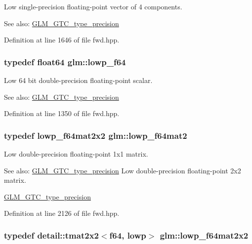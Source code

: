 Low single-precision floating-point vector of 4 components. \begin{Desc}
\item[See also:]\hyperlink{group__gtc__type__precision}{GLM\_\-GTC\_\-type\_\-precision} \end{Desc}


Definition at line 1646 of file fwd.hpp.\hypertarget{group__gtc__type__precision_g59839f4bf6b97c93b0def577890bbfb8}{
\subsubsection[lowp\_\-f64]{\setlength{\rightskip}{0pt plus 5cm}typedef float64 {\bf glm::lowp\_\-f64}}}
\label{group__gtc__type__precision_g59839f4bf6b97c93b0def577890bbfb8}


Low 64 bit double-precision floating-point scalar. \begin{Desc}
\item[See also:]\hyperlink{group__gtc__type__precision}{GLM\_\-GTC\_\-type\_\-precision} \end{Desc}


Definition at line 1350 of file fwd.hpp.\hypertarget{group__gtc__type__precision_g2984b3b0b6ee0657044d186bb875b4e3}{
\subsubsection[lowp\_\-f64mat2]{\setlength{\rightskip}{0pt plus 5cm}typedef lowp\_\-f64mat2x2 {\bf glm::lowp\_\-f64mat2}}}
\label{group__gtc__type__precision_g2984b3b0b6ee0657044d186bb875b4e3}


Low double-precision floating-point 1x1 matrix. \begin{Desc}
\item[See also:]\hyperlink{group__gtc__type__precision}{GLM\_\-GTC\_\-type\_\-precision} Low double-precision floating-point 2x2 matrix. 

\hyperlink{group__gtc__type__precision}{GLM\_\-GTC\_\-type\_\-precision} \end{Desc}


Definition at line 2126 of file fwd.hpp.\hypertarget{group__gtc__type__precision_g38e41c5332b4eb20b23b4ed1f06608d4}{
\subsubsection[lowp\_\-f64mat2x2]{\setlength{\rightskip}{0pt plus 5cm}typedef detail::tmat2x2$<$f64, lowp$>$ {\bf glm::lowp\_\-f64mat2x2}}}
\label{group__gtc__type__precision_g38e41c5332b4eb20b23b4ed1f06608d4}


